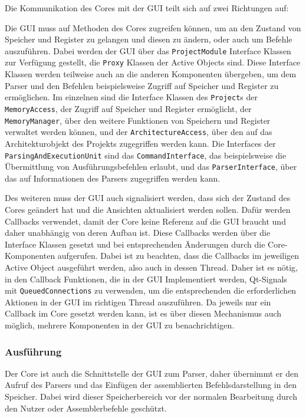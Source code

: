 Die Kommunikation des Cores mit der GUI teilt sich auf zwei Richtungen auf:

Die GUI muss auf Methoden des Cores zugreifen können, um an den Zustand von
Speicher und Register zu gelangen und diesen zu ändern, oder auch um Befehle
auszuführen. Dabei werden der GUI über das \texttt{ProjectModule} Interface
Klassen zur Verfügung gestellt, die \texttt{Proxy} Klassen der Active Objects
sind. Diese Interface Klassen werden teilweise auch an die anderen Komponenten
übergeben, um dem Parser und den Befehlen beispielsweise Zugriff auf Speicher
und Register zu ermöglichen. Im einzelnen sind die Interface Klassen des
\texttt{Project}s der \texttt{MemoryAccess}, der Zugriff auf Speicher und
Register ermöglicht, der \texttt{MemoryManager}, über den weitere Funktionen von
Speichern und Register verwaltet werden können, und der
\texttt{ArchitectureAccess}, über den auf das Architekturobjekt des Projekts
zugegriffen werden kann. Die Interfaces der \texttt{ParsingAndExecutionUnit}
sind das \texttt{CommandInterface}, das beispielsweise die Übermittlung von
Ausführungsbefehlen erlaubt, und das \texttt{ParserInterface}, über das auf
Informationen des Parsers zugegriffen werden kann.

Des weiteren muss der GUI auch signalisiert werden, dass sich der Zustand des
Cores geändert hat und die Ansichten aktualisiert werden sollen. Dafür werden
Callbacks verwendet, damit der Core keine Referenz auf die GUI braucht und daher
unabhängig von deren Aufbau ist. Diese Callbacks werden über die Interface
Klassen gesetzt und bei entsprechenden Änderungen durch die Core-Komponenten
aufgerufen. Dabei ist zu beachten, dass die Callbacks im jeweiligen Active
Object ausgeführt werden, also auch in dessen Thread. Daher ist es nötig, in den
Callback Funktionen, die in der GUI Implementiert werden, Qt-Signals mit
\texttt{QueuedConnections} zu verwenden, um die entsprechenden die
erforderlichen Aktionen in der GUI im richtigen Thread auszuführen. Da jeweils
nur ein Callback im Core gesetzt werden kann, ist es über diesen Mechanismus
auch möglich, mehrere Komponenten in der GUI zu benachrichtigen.

\subsubsection{Ausführung}

Der Core ist auch die Schnittstelle der GUI zum Parser, daher übernimmt er den
Aufruf des Parsers und das Einfügen der assemblierten Befehlsdarstellung in den
Speicher. Dabei wird dieser Speicherbereich vor der normalen Bearbeitung durch
den Nutzer oder Assemblerbefehle geschützt.

